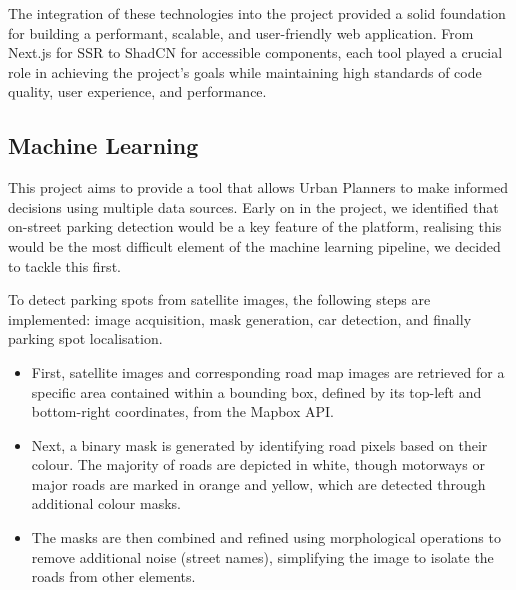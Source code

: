 \noindent{}The integration of these technologies into the project provided a
solid foundation for building a performant, scalable, and user-friendly web
application. From Next.js for SSR to ShadCN for accessible components, each tool
played a crucial role in achieving the project’s goals while maintaining high
standards of code quality, user experience, and performance.

\subsection{Machine Learning}

This project aims to provide a tool that allows Urban Planners to make informed
decisions using multiple data sources. Early on in the project, we identified
that on-street parking detection would be a key feature of the platform,
realising this would be the most difficult element of the machine learning
pipeline, we decided to tackle this first.

\noindent{}To detect parking spots from satellite images, the following steps
are implemented: image acquisition, mask generation, car detection, and finally
parking spot localisation.

\vspace{-3mm}
\begin{itemize}
  \item{First, satellite images and corresponding road map images are retrieved
  for a specific area contained within a bounding box, defined by its top-left
  and bottom-right coordinates, from the Mapbox API.}
  \vspace{1.25mm}

  \item{Next, a binary mask is generated by identifying road pixels based on
  their colour. The majority of roads are depicted in white, though motorways or
  major roads are marked in orange and yellow, which are detected through
  additional colour masks.}
  \vspace{1.25mm}

  \pagebreak{}

  \item{The masks are then combined and refined using morphological operations
  to remove additional noise (street names), simplifying the image to isolate
  the roads from other elements.}
\end{itemize}


